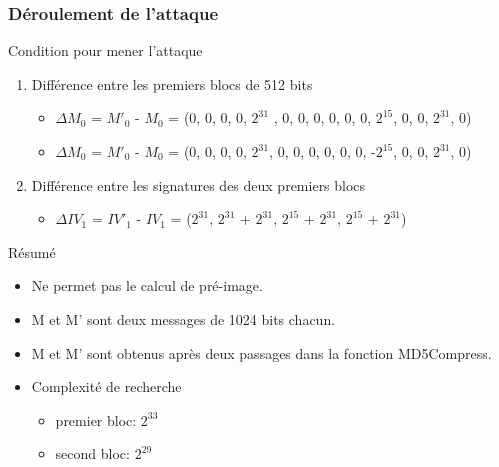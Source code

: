 	\begin{frame}
		\frametitle{D\'eroulement de l'attaque}
		\begin{block}{Condition pour mener l'attaque}
		  \begin{enumerate}
		  \item Diff\'erence entre les premiers blocs de 512 bits 
		    \begin{itemize}
		    \item $\Delta$$M_{0}$ = $M'_{0}$ - $M_{0}$ = (0, 0, 0, 0, $2^{31}$ , 0, 0, 0, 0, 0, 0, $2^{15}$, 0, 0, $2^{31}$, 0)
		    \end{itemize}
		    \begin{itemize}
		    \item $\Delta$$M_{0}$ = $M'_{0}$ - $M_{0}$ = (0, 0, 0, 0, $2^{31}$, 0, 0, 0, 0, 0, 0, -$2^{15}$, 0, 0, $2^{31}$, 0)
		    \end{itemize}
		  \item Diff\'erence entre les signatures des deux premiers blocs
		   \begin{itemize}
		   \item $\Delta$$IV_{1}$ = $IV'_{1}$ - $IV_{1}$ = ($2^{31}$, $2^{31}$ + $2^{31}$, $2^{15}$ + $2^{31}$, $2^{15}$ + $2^{31}$)
		   \end{itemize}

		  \end{enumerate}
		\end{block}
	
		\begin{block}{R\'esum\'e}
		 \begin{itemize}
		 \item Ne permet pas le calcul de pr\'e-image.
		 \item M et M' sont deux messages de 1024 bits chacun.
		 \item M et M' sont obtenus apr\`es deux passages dans la fonction MD5Compress.
		 \item Complexité de recherche
		 \begin{itemize}
		 \item premier bloc: $2^{33}$
		 \item second bloc: $2^{29}$
		 \end{itemize}
		\end{itemize}
		\end{block}
	\end{frame} 




